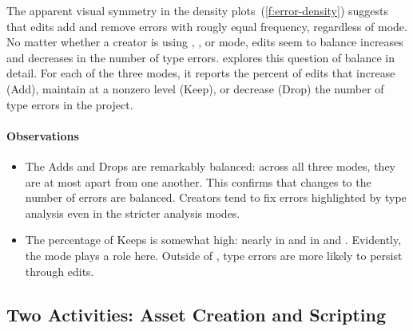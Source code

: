 \documentclass[english,submission,cleveref]{programming}
\begin{document}
The apparent visual symmetry in the density plots~(\cref{f:error-density})
suggests that edits add and remove errors with rougly equal frequency,
regardless of mode.
No matter whether a creator is using \mnocheck{}, \mnonstrict{},
or \mstrict{} mode, edits seem to balance increases and decreases in the number
of type errors.
 explores this question of balance in detail.
For each of the three modes, it reports the percent of edits that increase (Add),
maintain at a nonzero level (Keep), or decrease (Drop) the number of type
errors in the project.


\paragraph{Observations}

\begin{itemize}
  \item
    The Adds and Drops are remarkably balanced: across all three modes, they are
    at most  apart from one another.
    This confirms that changes to the number of errors are balanced.
    Creators tend to fix errors highlighted by type analysis
    even in the stricter analysis modes.

  \item
    The percentage of Keeps is somewhat high: nearly  in \mnocheck{}
    and  in \mnonstrict{} and \mstrict{}.
    Evidently, the mode plays a role here.
    Outside of \mnocheck{}, type errors are more likely to persist through edits.

\end{itemize}


\subsection{Two Activities: Asset Creation and Scripting}
\label{s:strict-vs-forcedstrict}
\end{document}
